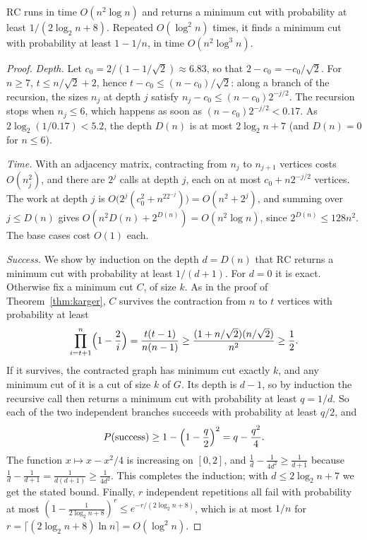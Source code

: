 \begin{theorem}\label{thm:kargerstein}
$\mathrm{RC}$ runs in time $O(n^2\log n)$ and returns a minimum cut with probability at least $1/(2\log_2n+8)$. Repeated $O(\log^2n)$ times, it finds a minimum cut with probability at least $1-1/n$, in time $O(n^2\log^3n)$.
\end{theorem}
\begin{proof}
\emph{Depth.} Let $c_0=2/(1-1/\sqrt2)\approx6.83$, so that $2-c_0=-c_0/\sqrt2$. For $n\ge7$, $t\le n/\sqrt2+2$, hence $t-c_0\le(n-c_0)/\sqrt2$: along a branch of the recursion, the sizes $n_j$ at depth $j$ satisfy
$n_j-c_0\le(n-c_0)2^{-j/2}$. The recursion stops when $n_j\le6$, which happens as soon as $(n-c_0)2^{-j/2}<0.17$. As $2\log_2(1/0.17)<5.2$, the depth $D(n)$ is at most $2\log_2n+7$ (and $D(n)=0$ for $n\le6$).

\emph{Time.} With an adjacency matrix, contracting from $n_j$ to $n_{j+1}$ vertices costs $O(n_j^2)$, and there are $2^j$ calls at depth $j$, each on at most $c_0+n2^{-j/2}$ vertices. The work at depth $j$ is
$O\bigl(2^j(c_0^2+n^22^{-j})\bigr)=O(n^2+2^j)$, and summing over $j\le D(n)$ gives $O(n^2D(n)+2^{D(n)})=O(n^2\log n)$, since $2^{D(n)}\le128n^2$. The base cases cost $O(1)$ each.

\emph{Success.} We show by induction on the depth $d=D(n)$ that $\mathrm{RC}$ returns a minimum cut with probability at least $1/(d+1)$. For $d=0$ it is exact. Otherwise fix a minimum cut $C$, of size $k$. As in the proof of
Theorem~\ref{thm:karger}, $C$ survives the contraction from $n$ to $t$ vertices with probability at least
\[
\prod_{i=t+1}^n\Bigl(1-\frac2i\Bigr)=\frac{t(t-1)}{n(n-1)}\ge\frac{(1+n/\sqrt2)(n/\sqrt2)}{n^2}\ge\frac12.
\]
If it survives, the contracted graph has minimum cut exactly $k$, and any minimum cut of it is a cut of size $k$ of $G$. Its depth is $d-1$, so by induction the recursive call then returns a minimum cut with probability at least
$q=1/d$. So each of the two independent branches succeeds with probability at least $q/2$, and
\[
P(\text{success})\ge1-\Bigl(1-\frac q2\Bigr)^2=q-\frac{q^2}4.
\]
The function $x\mapsto x-x^2/4$ is increasing on $[0,2]$, and
$\frac1d-\frac1{4d^2}\ge\frac1{d+1}$ because $\frac1d-\frac1{d+1}=\frac1{d(d+1)}\ge\frac1{4d^2}$. This completes the induction; with $d\le2\log_2n+7$ we get the stated bound. Finally, $r$ independent repetitions all fail with probability at most
$(1-\frac1{2\log_2n+8})^r\le e^{-r/(2\log_2n+8)}$, which is at most $1/n$ for $r=\lceil(2\log_2n+8)\ln n\rceil=O(\log^2n)$.
\end{proof}

